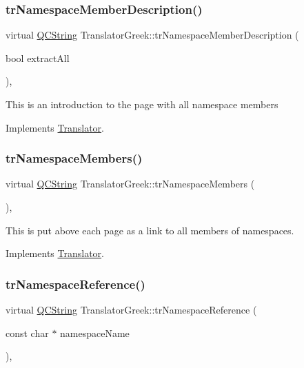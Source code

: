 \subsubsection{\texorpdfstring{trNamespaceMemberDescription()}{trNamespaceMemberDescription()}}
{\footnotesize\ttfamily virtual \mbox{\hyperlink{class_q_c_string}{Q\+C\+String}} Translator\+Greek\+::tr\+Namespace\+Member\+Description (\begin{DoxyParamCaption}\item[{bool}]{extract\+All }\end{DoxyParamCaption})\hspace{0.3cm}{\ttfamily [inline]}, {\ttfamily [virtual]}}

This is an introduction to the page with all namespace members 

Implements \mbox{\hyperlink{class_translator}{Translator}}.

\mbox{\label{class_translator_greek_a8974604fd14909af39fd8269edc90b79}} 
\subsubsection{\texorpdfstring{trNamespaceMembers()}{trNamespaceMembers()}}
{\footnotesize\ttfamily virtual \mbox{\hyperlink{class_q_c_string}{Q\+C\+String}} Translator\+Greek\+::tr\+Namespace\+Members (\begin{DoxyParamCaption}{ }\end{DoxyParamCaption})\hspace{0.3cm}{\ttfamily [inline]}, {\ttfamily [virtual]}}

This is put above each page as a link to all members of namespaces. 

Implements \mbox{\hyperlink{class_translator}{Translator}}.

\mbox{\label{class_translator_greek_afbb0c25e8751adf20dc95f9cb181dce6}} 
\subsubsection{\texorpdfstring{trNamespaceReference()}{trNamespaceReference()}}
{\footnotesize\ttfamily virtual \mbox{\hyperlink{class_q_c_string}{Q\+C\+String}} Translator\+Greek\+::tr\+Namespace\+Reference (\begin{DoxyParamCaption}\item[{const char $\ast$}]{namespace\+Name }\end{DoxyParamCaption})\hspace{0.3cm}{\ttfamily [inline]}, {\ttfamily [virtual]}}

